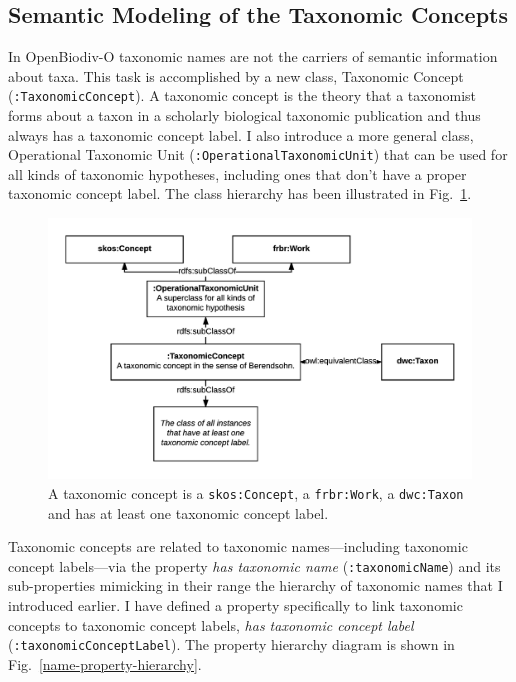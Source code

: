 \subsection{Semantic Modeling of the Taxonomic Concepts}

In OpenBiodiv-O taxonomic names are not the carriers of semantic information about taxa. This task is accomplished by a new class, Taxonomic Concept ({\tt :TaxonomicConcept}). A taxonomic concept is the theory that a taxonomist forms about a taxon in a scholarly biological taxonomic publication and thus always has a taxonomic concept label. I also introduce a more general class, Operational Taxonomic Unit ({\tt :OperationalTaxonomicUnit}) that can be used for all kinds of taxonomic hypotheses, including ones that don't have a proper taxonomic concept label. The class hierarchy has been illustrated in Fig.~\ref{taxonomic-concept-diagram}.

\begin{figure}[h!]
\centering
  \includegraphics[width=\textwidth]{Figures/taxonomic-concept-diagram}
  \decoRule
  \caption[Taxonomic concept diagram.]{
  A taxonomic concept is a {\tt skos:Concept}, a {\tt frbr:Work}, a {\tt dwc:Taxon} and has at least one taxonomic concept label.}
  \label{taxonomic-concept-diagram}
\end{figure}

Taxonomic concepts are related to taxonomic names---including taxonomic concept labels---via the property \emph{has taxonomic name} ({\tt :taxonomicName}) and its sub-properties mimicking in their range the hierarchy of taxonomic names that I introduced earlier. I have defined a property specifically to link taxonomic concepts to taxonomic concept labels, \emph{has taxonomic concept label} ({\tt :taxonomicConceptLabel}). The property hierarchy diagram is shown in Fig.~\ref{name-property-hierarchy}.


